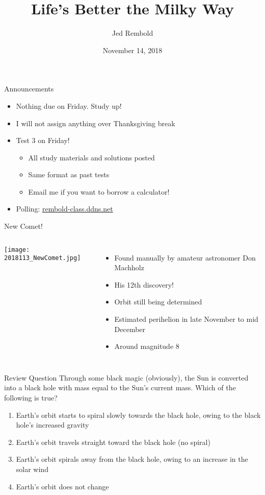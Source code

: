 \documentclass[pdf,aspectratio=169]{beamer}
\title{Life's Better the Milky Way}
\date{November 14, 2018}
\author{Jed Rembold}
\begin{document}
\renewcommand*{\theenumi}{\Alph{enumi}}

\begin{frame}{Announcements}
  \begin{itemize}
	\item Nothing due on Friday. Study up!
	\item I will not assign anything over Thanksgiving break
	\item Test 3 on Friday!
	  \begin{itemize}
		\item All study materials and solutions posted
		\item Same format as past tests
		\item Email me if you want to borrow a calculator!
	  \end{itemize}
	\item Polling: \url{rembold-class.ddns.net}
  \end{itemize}
\end{frame}

\begin{frame}{New Comet!}
	\begin{columns}
		\begin{center}
			\texttt{[image: 2018113\_NewComet.jpg]}
		\end{center}
		
		\begin{itemize}
			\item Found manually by amateur astronomer Don Machholz
			\item His 12th discovery!
			\item Orbit still being determined
			\item Estimated perihelion in late November to mid December
			\item Around magnitude 8
		\end{itemize}
		
	\end{columns}
\end{frame}

\begin{frame}{Review Question}
  Through some black magic (obviously), the Sun is converted into a black hole with mass equal to the Sun's current mass. Which of the following is true?
  \begin{enumerate}
	\item Earth's orbit starts to spiral slowly towards the black hole, owing to the black hole's increased gravity
	\item Earth's orbit travels straight toward the black hole (no spiral)
	\item Earth's orbit spirals away from the black hole, owing to an increase in the solar wind
	\item \alert<2>{Earth's orbit does not change}
  \end{enumerate}
\end{frame}
\end{document}
